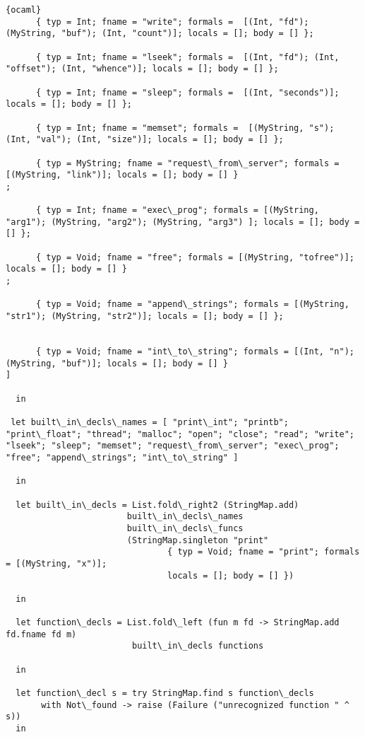 \begin{lstlisting}{ocaml}
      { typ = Int; fname = "write"; formals =  [(Int, "fd"); (MyString, "buf"); (Int, "count")]; locals = []; body = [] };

      { typ = Int; fname = "lseek"; formals =  [(Int, "fd"); (Int, "offset"); (Int, "whence")]; locals = []; body = [] };

      { typ = Int; fname = "sleep"; formals =  [(Int, "seconds")]; locals = []; body = [] };
      
      { typ = Int; fname = "memset"; formals =  [(MyString, "s"); (Int, "val"); (Int, "size")]; locals = []; body = [] };

      { typ = MyString; fname = "request\_from\_server"; formals = [(MyString, "link")]; locals = []; body = [] } 
;

      { typ = Int; fname = "exec\_prog"; formals = [(MyString, "arg1"); (MyString, "arg2"); (MyString, "arg3") ]; locals = []; body = [] };

      { typ = Void; fname = "free"; formals = [(MyString, "tofree")]; locals = []; body = [] }
;

      { typ = Void; fname = "append\_strings"; formals = [(MyString, "str1"); (MyString, "str2")]; locals = []; body = [] };
 
     
      { typ = Void; fname = "int\_to\_string"; formals = [(Int, "n"); (MyString, "buf")]; locals = []; body = [] }
]

  in

 let built\_in\_decls\_names = [ "print\_int"; "printb"; "print\_float"; "thread"; "malloc"; "open"; "close"; "read"; "write"; "lseek"; "sleep"; "memset"; "request\_from\_server"; "exec\_prog"; "free"; "append\_strings"; "int\_to\_string" ]

  in

  let built\_in\_decls = List.fold\_right2 (StringMap.add)
                        built\_in\_decls\_names
                        built\_in\_decls\_funcs
                        (StringMap.singleton "print"
                                { typ = Void; fname = "print"; formals = [(MyString, "x")];
                                locals = []; body = [] })

  in

  let function\_decls = List.fold\_left (fun m fd -> StringMap.add fd.fname fd m)
                         built\_in\_decls functions

  in

  let function\_decl s = try StringMap.find s function\_decls
       with Not\_found -> raise (Failure ("unrecognized function " ^ s))
  in


\end{lstlisting}
